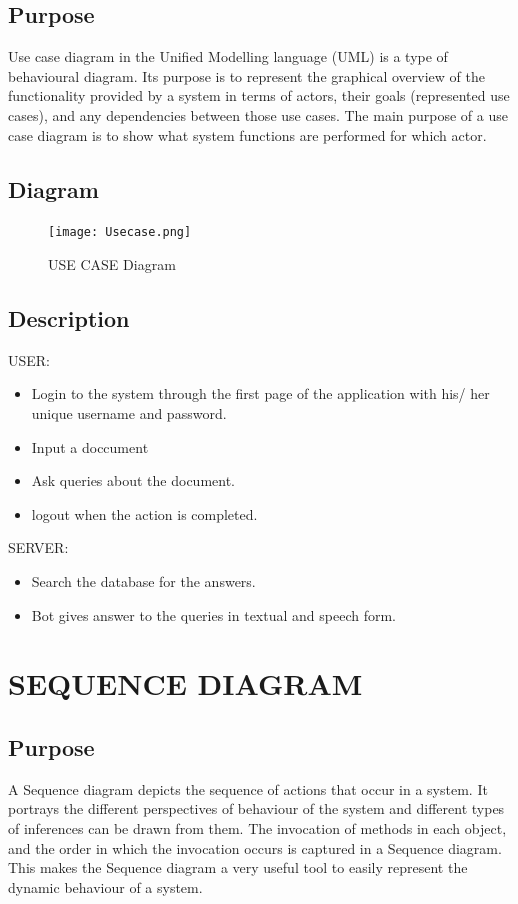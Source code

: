 \documentclass[12pt,a4paper,oneside]{report}
\begin{document}
\subsection{Purpose}
Use case diagram in the Unified Modelling language (UML) is a type of behavioural
diagram. Its purpose is to represent the graphical overview of the functionality provided by a
system in terms of actors, their goals (represented use cases), and any dependencies between
those use cases. The main purpose of a use case diagram is to show what system functions are
performed for which actor.\\
\newpage
\subsection{Diagram}
\begin{figure}[h]
  	\begin{center}
  		\texttt{[image: Usecase.png]}
  			\caption{USE CASE Diagram}
  			\label{USE CASE Diagram}
  	\end{center}
  \end{figure}
\subsection{Description}
USER:
\begin{itemize}

\item{Login to the system through the first page of the application with his/ her unique username
and password.}
\item{Input a doccument}
\item{Ask queries about the document.}
\item{logout when the action is completed.}
\end{itemize}
\newpage
SERVER:
\begin{itemize}
\item{Search the database for the answers.}
\item{Bot gives answer to the queries in textual and speech form.}
\end{itemize}
\section{SEQUENCE DIAGRAM}
\subsection{Purpose}
A Sequence diagram depicts the sequence of actions that occur in a system. It portrays the
different perspectives of behaviour of the system and different types of inferences can be drawn
from them. The invocation of methods in each object, and the order in which the invocation
occurs is captured in a Sequence diagram. This makes the Sequence diagram a very useful tool
to easily represent the dynamic behaviour of a system.\\
\end{document}
